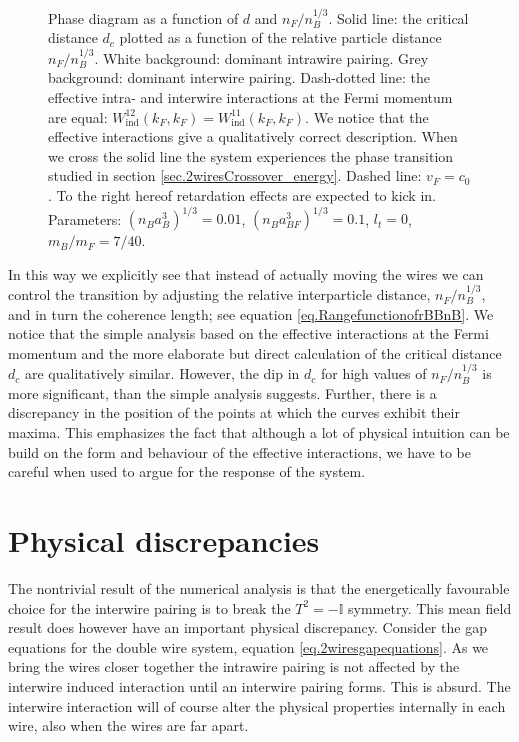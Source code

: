 \begin{figure} 
\begin{center}  
  
\caption{Phase diagram as a function of $d$ and $n_F/n_B^{1/3}$. Solid line: the critical distance $d_c$ plotted as a function of the relative particle distance $n_F/n_B^{1/3}$. White background: dominant intrawire pairing. Grey background: dominant interwire pairing. Dash-dotted line: the effective intra- and interwire interactions at the Fermi momentum are equal: $W^{12}_{\text{ind}}(k_F, k_F) = W^{11}_{\text{ind}}(k_F, k_F)$. We notice that the effective interactions give a qualitatively correct description. When we cross the solid line the system experiences the phase transition studied in section \ref{sec.2wiresCrossover_energy}. Dashed line: $v_F = c_0$. To the right hereof retardation effects are expected to kick in. Parameters: $(n_Ba_B^3)^{1/3} = 0.01$, $(n_Ba_{BF}^3)^{1/3} = 0.1$, $l_t = 0$, $m_B / m_F = 7/40$. }  
\label{fig.twowirescrossovernBdepend}  
\end{center}    
\end{figure}

In this way we explicitly see that instead of actually moving the wires we can control the transition by adjusting the relative interparticle distance, $n_F/n_B^{1/3}$, and in turn the coherence length; see equation \eqref{eq.RangefunctionofrBBnB}. We notice that the simple analysis based on the effective interactions at the Fermi momentum and the more elaborate but direct calculation of the critical distance $d_c$ are qualitatively similar. However, the dip in $d_c$ for high values of $n_F/n_B^{1/3}$ is more significant, than the simple analysis suggests. Further, there is a discrepancy in the position of the points at which the curves exhibit their maxima. This emphasizes the fact that although a lot of physical intuition can be build on the form and behaviour of the effective interactions, we have to be careful when used to argue for the response of the system.

\section{Physical discrepancies} \label{sec.physicaldiscrepancies}
The nontrivial result of the numerical analysis is that the energetically favourable choice for the interwire pairing is to break the $T^2 = -\mathbb{I}$ symmetry. This mean field result does however have an important physical discrepancy. Consider the gap equations for the double wire system, equation \eqref{eq.2wiresgapequations}. As we bring the wires closer together the intrawire pairing is not affected by the interwire induced interaction until an interwire pairing forms. This is absurd. The interwire interaction will of course alter the physical properties internally in each wire, also when the wires are far apart. 

